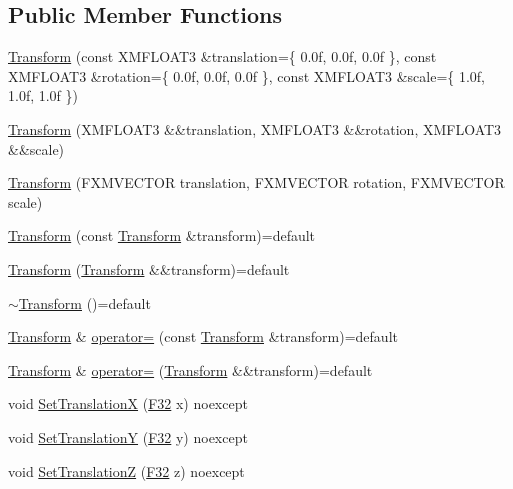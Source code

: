 \subsection*{Public Member Functions}
\begin{DoxyCompactItemize}
\item 
\hyperlink{classmage_1_1_transform_a3d324dc935e11ee5e82957d58553fd7d}{Transform} (const X\+M\+F\+L\+O\+A\+T3 \&translation=\{ 0.\+0f, 0.\+0f, 0.\+0f \}, const X\+M\+F\+L\+O\+A\+T3 \&rotation=\{ 0.\+0f, 0.\+0f, 0.\+0f \}, const X\+M\+F\+L\+O\+A\+T3 \&scale=\{ 1.\+0f, 1.\+0f, 1.\+0f \})
\item 
\hyperlink{classmage_1_1_transform_aa2f3e3e655a2d50404b75871a8c358c3}{Transform} (X\+M\+F\+L\+O\+A\+T3 \&\&translation, X\+M\+F\+L\+O\+A\+T3 \&\&rotation, X\+M\+F\+L\+O\+A\+T3 \&\&scale)
\item 
\hyperlink{classmage_1_1_transform_a3e5384097613e06e6681d43a0748e45b}{Transform} (F\+X\+M\+V\+E\+C\+T\+OR translation, F\+X\+M\+V\+E\+C\+T\+OR rotation, F\+X\+M\+V\+E\+C\+T\+OR scale)
\item 
\hyperlink{classmage_1_1_transform_acea4b0d9eb6fc574cff9046d1d1d3f63}{Transform} (const \hyperlink{classmage_1_1_transform}{Transform} \&transform)=default
\item 
\hyperlink{classmage_1_1_transform_a79c128d8c73c8854765e8ea8fa5f42e1}{Transform} (\hyperlink{classmage_1_1_transform}{Transform} \&\&transform)=default
\item 
\hyperlink{classmage_1_1_transform_a2da8c6542920e0748a504c32c54073f6}{$\sim$\+Transform} ()=default
\item 
\hyperlink{classmage_1_1_transform}{Transform} \& \hyperlink{classmage_1_1_transform_a399c432b387235b3ae964bfed27ac95c}{operator=} (const \hyperlink{classmage_1_1_transform}{Transform} \&transform)=default
\item 
\hyperlink{classmage_1_1_transform}{Transform} \& \hyperlink{classmage_1_1_transform_a73f47760665264da8af254fa937b3560}{operator=} (\hyperlink{classmage_1_1_transform}{Transform} \&\&transform)=default
\item 
void \hyperlink{classmage_1_1_transform_a99a7e4aaba6cee799bb014d9a1b5e227}{Set\+TranslationX} (\hyperlink{namespacemage_aa97e833b45f06d60a0a9c4fc22ae02c0}{F32} x) noexcept
\item 
void \hyperlink{classmage_1_1_transform_ae33a9ea844cac0bdb303e4e347e576c3}{Set\+TranslationY} (\hyperlink{namespacemage_aa97e833b45f06d60a0a9c4fc22ae02c0}{F32} y) noexcept
\item 
void \hyperlink{classmage_1_1_transform_a71009b20361c01c0ffbd981986d323e8}{Set\+TranslationZ} (\hyperlink{namespacemage_aa97e833b45f06d60a0a9c4fc22ae02c0}{F32} z) noexcept

\end{DoxyCompactItemize}
